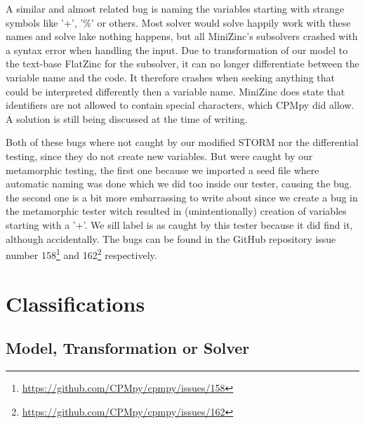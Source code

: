 A similar and almost related bug is naming the variables starting with strange symbols like '+', '\%' or others. Most solver would solve happily work with these names and solve lake nothing happens, but all MiniZinc's subsolvers crashed with a syntax error when handling the input. Due to transformation of our model to the text-base FlatZinc for the subsolver, it can no longer differentiate between the variable name and the code. It therefore crashes when seeking anything that could be interpreted differently then a variable name. MiniZinc does state that identifiers  are not allowed to contain special characters, which CPMpy did allow. A solution is still being discussed at the time of writing.


Both of these bugs where not caught by our modified STORM nor the differential testing, since they do not create new variables. But were caught by our metamorphic testing, the first one because we imported a seed file where automatic naming was done which we did too inside our tester, causing the bug. the second one is a bit more embarrassing to write about since we create a bug in the metamorphic tester witch resulted in (unintentionally) creation of variables starting with a '+'. We sill label is as caught by this tester because it did find it, although accidentally. The bugs can be found in the GitHub repository issue number 158\footnote{\url{https://github.com/CPMpy/cpmpy/issues/158}} and 162\footnote{\url{https://github.com/CPMpy/cpmpy/issues/162}} respectively.



%
%





\section{Classifications}
\subsection{Model, Transformation or Solver}

